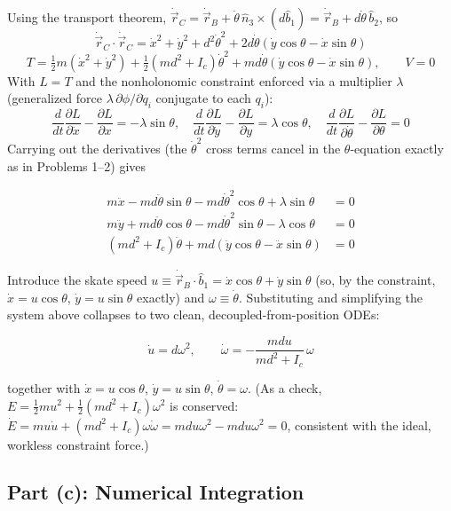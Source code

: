 \documentclass[11pt]{article}
\begin{document}
Using the transport theorem, $\dot{\vec r}_C = \dot{\vec r}_B + \dot\theta\,\hat n_3\times(d\hat b_1) = \dot{\vec r}_B + d\dot\theta\,\hat b_2$, so
\[
    \dot{\vec r}_C\cdot\dot{\vec r}_C = \dot x^2+\dot y^2+d^2\dot\theta^2+2d\dot\theta(\dot y\cos\theta-\dot x\sin\theta)
\]
\[
    T = \tfrac12 m(\dot x^2+\dot y^2) + \tfrac12(md^2+I_c)\dot\theta^2 + md\dot\theta(\dot y\cos\theta-\dot x\sin\theta),
    \qquad V=0
\]
With $L=T$ and the nonholonomic constraint enforced via a multiplier $\lambda$ (generalized force $\lambda\,\partial\phi/\partial\dot q_i$ conjugate to each $q_i$):
\[
    \frac{d}{dt}\frac{\partial L}{\partial\dot x}-\frac{\partial L}{\partial x}=-\lambda\sin\theta,
    \quad
    \frac{d}{dt}\frac{\partial L}{\partial\dot y}-\frac{\partial L}{\partial y}=\lambda\cos\theta,
    \quad
    \frac{d}{dt}\frac{\partial L}{\partial\dot\theta}-\frac{\partial L}{\partial\theta}=0
\]
Carrying out the derivatives (the $\dot\theta^2$ cross terms cancel in the $\theta$-equation exactly as in Problems 1--2) gives
\begin{result}
\begin{align*}
    m\ddot x - md\ddot\theta\sin\theta - md\dot\theta^2\cos\theta + \lambda\sin\theta &= 0\\
    m\ddot y + md\ddot\theta\cos\theta - md\dot\theta^2\sin\theta - \lambda\cos\theta &= 0\\
    (md^2+I_c)\ddot\theta + md(\ddot y\cos\theta-\ddot x\sin\theta) &= 0
\end{align*}
\end{result}
Introduce the skate speed $u\equiv\dot{\vec r}_B\cdot\hat b_1=\dot x\cos\theta+\dot y\sin\theta$ (so, by the constraint, $\dot x=u\cos\theta$, $\dot y=u\sin\theta$ exactly) and $\omega\equiv\dot\theta$. Substituting and simplifying the system above collapses to two clean, decoupled-from-position ODEs:
\begin{result}
\[
    \dot u = d\omega^2,
    \qquad
    \dot\omega = -\frac{mdu}{md^2+I_c}\,\omega
\]
\end{result}
together with $\dot x=u\cos\theta$, $\dot y=u\sin\theta$, $\dot\theta=\omega$. (As a check, $E=\tfrac12mu^2+\tfrac12(md^2+I_c)\omega^2$ is conserved: $\dot E = mu\dot u+(md^2+I_c)\omega\dot\omega=mdu\omega^2-mdu\omega^2=0$, consistent with the ideal, workless constraint force.)

\subsection*{Part (c): Numerical Integration}
\end{document}
